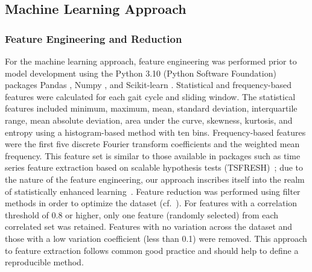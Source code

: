 \documentclass[sensors,article,accept,pdftex,moreauthors]{Definitions/mdpi}
\begin{document}
\subsection{Machine Learning Approach}
\subsubsection{Feature Engineering and Reduction}
For the machine learning approach, feature engineering was performed prior to model development using the Python 3.10 (Python Software Foundation) packages Pandas \cite{reback2020pandas}, Numpy \cite{harris2020array}, and Scikit-learn \cite{scikit-learn}. Statistical and frequency-based features were calculated for each gait cycle and sliding window. The statistical features included minimum, maximum, mean, standard deviation, interquartile range, mean absolute deviation, area under the curve, skewness, kurtosis, and entropy using a histogram-based method with ten bins. Frequency-based features were the first five discrete Fourier transform coefficients and the weighted mean frequency. This feature set is similar to those available in packages such as time series feature extraction based on scalable hypothesis tests (TSFRESH)~\cite{tsfresh_2018}; due to the nature of the feature engineering, our approach inscribes itself into the realm of statistically enhanced learning~\cite{felice2025boosting}. 
Feature reduction was performed using filter methods in order to optimize the dataset (cf.~\cite{saeys_2007}). For features with a correlation threshold of 0.8 or higher, only one feature (randomly selected) from each correlated set was retained. Features with no variation across the dataset and those with a low variation coefficient (less than 0.1) were removed. This approach to feature extraction follows common good practice and should help to define a reproducible method.
\end{document}
